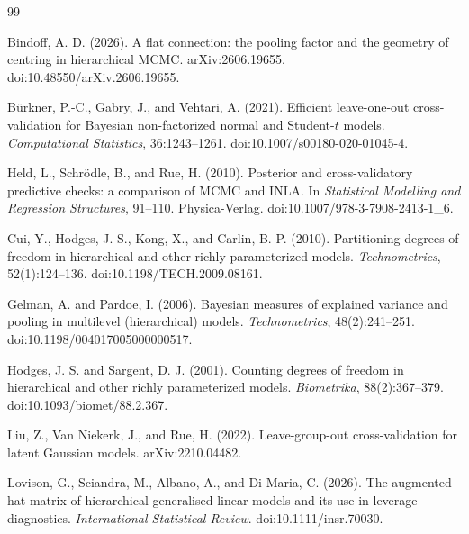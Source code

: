 \documentclass[11pt]{article}
\begin{document}

\begin{thebibliography}{99}

Bindoff, A. D. (2026).
\newblock A flat connection: the pooling factor and the geometry of centring in
hierarchical MCMC.
\newblock arXiv:2606.19655. doi:10.48550/arXiv.2606.19655.

Bürkner, P.-C., Gabry, J., and Vehtari, A. (2021).
\newblock Efficient leave-one-out cross-validation for Bayesian non-factorized
normal and Student-$t$ models.
\newblock \emph{Computational Statistics}, 36:1243--1261.
doi:10.1007/s00180-020-01045-4.

Held, L., Schrödle, B., and Rue, H. (2010).
\newblock Posterior and cross-validatory predictive checks: a comparison of MCMC
and INLA.
\newblock In \emph{Statistical Modelling and Regression Structures}, 91--110.
Physica-Verlag. doi:10.1007/978-3-7908-2413-1\_6.

Cui, Y., Hodges, J. S., Kong, X., and Carlin, B. P. (2010).
\newblock Partitioning degrees of freedom in hierarchical and other richly
parameterized models.
\newblock \emph{Technometrics}, 52(1):124--136. doi:10.1198/TECH.2009.08161.

Gelman, A. and Pardoe, I. (2006).
\newblock Bayesian measures of explained variance and pooling in multilevel
(hierarchical) models.
\newblock \emph{Technometrics}, 48(2):241--251. doi:10.1198/004017005000000517.

Hodges, J. S. and Sargent, D. J. (2001).
\newblock Counting degrees of freedom in hierarchical and other richly
parameterized models.
\newblock \emph{Biometrika}, 88(2):367--379. doi:10.1093/biomet/88.2.367.

Liu, Z., Van Niekerk, J., and Rue, H. (2022).
\newblock Leave-group-out cross-validation for latent Gaussian models.
\newblock arXiv:2210.04482.

Lovison, G., Sciandra, M., Albano, A., and Di Maria, C. (2026).
\newblock The augmented hat-matrix of hierarchical generalised linear models and its
use in leverage diagnostics.
\newblock \emph{International Statistical Review}. doi:10.1111/insr.70030.


\end{thebibliography}
\end{document}
